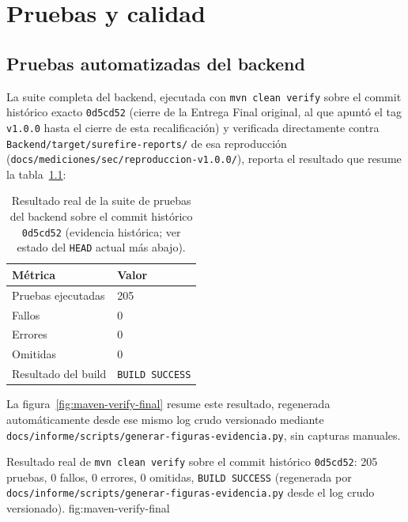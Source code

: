 \chapter{Pruebas y calidad}
\label{cap:pruebas-calidad}

\section{Pruebas automatizadas del backend}

La suite completa del backend, ejecutada con \texttt{mvn clean verify}
sobre el commit hist\'orico exacto \texttt{0d5cd52} (cierre de la Entrega
Final original, al que apunt\'o el tag \texttt{v1.0.0} hasta el cierre de
esta recalificaci\'on) y verificada directamente contra
\texttt{Backend/target/surefire-reports/} de esa reproducci\'on
(\texttt{docs/mediciones/sec/reproduccion-v1.0.0/}), reporta el resultado
que resume la tabla~\ref{tab:pruebas-final}:

\begin{table}[H]
  \centering
  \caption{Resultado real de la suite de pruebas del backend sobre el commit hist\'orico \texttt{0d5cd52} (evidencia hist\'orica; ver estado del \texttt{HEAD} actual m\'as abajo).}
  \label{tab:pruebas-final}
  \begin{tabular}{@{}ll@{}}
    \toprule
    M\'etrica & Valor \\
    \midrule
    Pruebas ejecutadas & 205 \\
    Fallos & 0 \\
    Errores & 0 \\
    Omitidas & 0 \\
    Resultado del build & \texttt{BUILD SUCCESS} \\
    \bottomrule
  \end{tabular}
\end{table}

La figura~\ref{fig:maven-verify-final} resume este resultado, regenerada
autom\'aticamente desde ese mismo log crudo versionado mediante
\texttt{docs/informe/scripts/generar-figuras-evidencia.py}, sin capturas
manuales.

%
{Resultado real de \texttt{mvn clean verify} sobre el commit hist\'orico \texttt{0d5cd52}: 205 pruebas, 0 fallos, 0 errores, 0 omitidas, \texttt{BUILD SUCCESS} (regenerada por \texttt{docs/informe/scripts/generar-figuras-evidencia.py} desde el log crudo versionado).}%
{fig:maven-verify-final}

